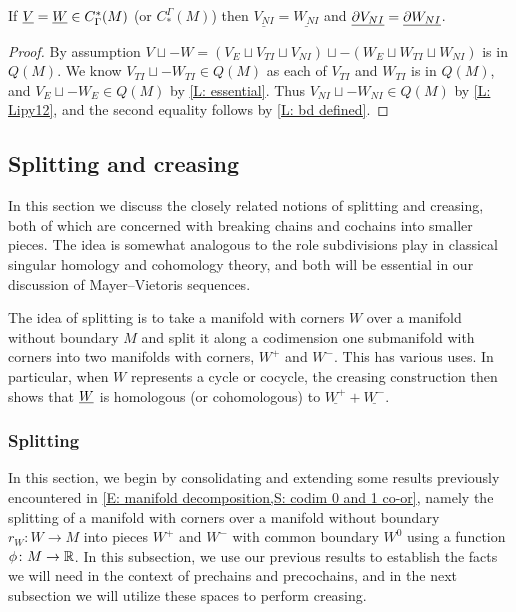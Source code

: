 \begin{corollary}\label{L: same NI}
	If $\underline{V} = \underline{W} \in C^*_\Gamma(M)$ (or $C_*^\Gamma(M)$) then
	$\underline{ V_{NI}} = \underline{ W_{NI}}$ and
	$\underline{\partial V_{NI}} = \underline{\partial W_{NI}}$.
\end{corollary}

\begin{proof}
	By assumption $V\sqcup-W = (V_E \sqcup V_{TI} \sqcup V_{NI}) \sqcup -(W_E \sqcup W_{TI} \sqcup W_{NI})$ is in $Q(M)$.
	We know $V_{TI} \sqcup -W_{TI} \in Q(M)$ as each of $V_{TI}$ and $W_{TI}$ is in $Q(M)$, and $V_E \sqcup -W_E \in Q(M)$ by \cref{L: essential}.
	Thus $V_{NI} \sqcup -W_{NI} \in Q(M)$ by \cref{L: Lipy12}, and the second equality follows by \cref{L: bd defined}.
\end{proof}


\subsection{Splitting and creasing}\label{S: splitting and creasing}

In this section we discuss the closely related notions of splitting and creasing, both of which are concerned with breaking chains and cochains into smaller pieces.
The idea is somewhat analogous to the role subdivisions play in classical singular homology and cohomology theory, and both will be essential in our discussion of Mayer--Vietoris sequences.

The idea of splitting is to take a manifold with corners $W$ over a manifold without boundary $M$ and split it along a codimension one submanifold with corners into two manifolds with corners, $W^+$ and $W^-$.
This has various uses.
In particular, when $W$ represents a cycle or cocycle, the creasing construction then shows that $\underline{W}$ is homologous (or cohomologous) to $\underline{W^+} + \underline{W^-}$.


\subsubsection{Splitting}\label{S: splitting}
In this section, we begin by consolidating and extending some results previously encountered in \cref{E: manifold decomposition,S: codim 0 and 1 co-or}, namely the splitting of a manifold with corners over a manifold without boundary $r_W \colon W \to M$ into pieces $W^+$ and $W^-$ with common boundary $W^0$ using a function $\phi \colon M \to \mathbb{R}$.
In this subsection, we use our previous results to establish the facts we will need in the context of prechains and precochains, and in the next subsection we will utilize these spaces to perform creasing.

